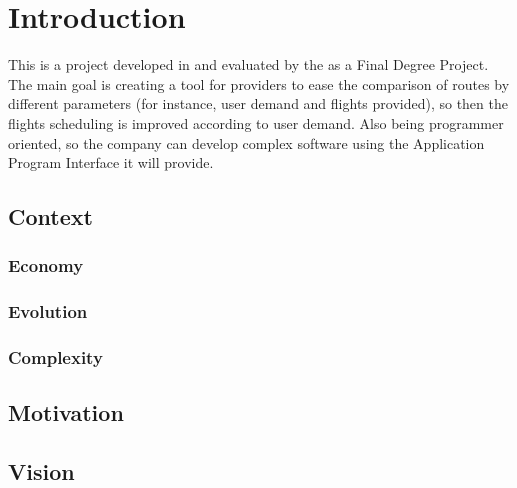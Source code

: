 
\chapter{Introduction}

\label{chapter01}

This is a project developed in \textit{\company} and evaluated by the \textit{\univname} as a Final Degree Project. The main goal is creating a tool for \textit{\company} providers to ease the comparison of routes by different parameters (for instance, user demand and flights provided), so then the flights scheduling is improved according to user demand. Also being programmer oriented, so the company can develop complex software using the Application Program Interface it will provide.

\section{Context}



\subsection{Economy}

\subsection{Evolution}

\subsection{Complexity}

\section{Motivation}

\section{Vision}